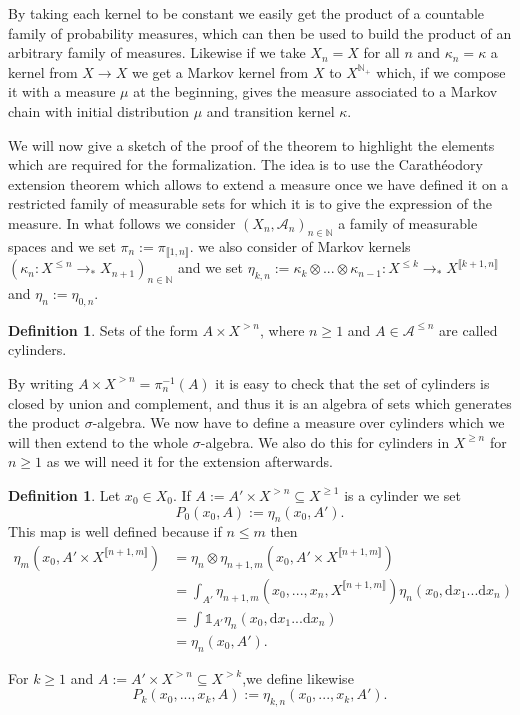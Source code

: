 \documentclass{article}
\newcommand{\A}{\mathcal{A}}
\newcommand{\N}{\mathbb{N}}
\newcommand{\inv}{^{-1}}
\newcommand{\Xge}[1]{X^{\ge#1}}
\newcommand{\Xle}[1]{X^{\le#1}}
\newcommand{\Xgt}[1]{X^{>#1}}
\newcommand{\Xgtn}{X^{>n}}
\newcommand{\Xlen}{X^{\le n}}
\newcommand{\Alen}{\mathcal{A}^{\le n}}
\newcommand{\dx}{\mathrm{d}x}
\newcommand{\prth}[1]{\left(#1\right)}
\newcommand{\dbrack}[1]{\llbracket #1 \rrbracket}
\newcommand{\ox}{\otimes}
\newcommand{\piun}{{\pi_{\dbrack{1,n}}}}
\newcommand{\Xint}[1]{X^{\dbrack{#1}}}
\newcommand{\tost}{\to_*}
\newcommand{\ind}[1]{\mathbb{1}_{#1}}
\theoremstyle{definition}
\newtheorem{defi}[thm]{Definition}
\theoremstyle{remark}
\begin{document}
	By taking each kernel to be constant we easily get the product of a countable family of probability measures, which can then be used to build the product of an arbitrary family of measures. Likewise if we take $X_n = X$ for all $n$ and $\kappa_n = \kappa$ a kernel from $X \to X$ we get a Markov kernel from $X$ to $X^{\N_+}$ which, if we compose it with a measure $\mu$ at the beginning, gives the measure associated to a Markov chain with initial distribution $\mu$ and transition kernel $\kappa$.

	We will now give a sketch of the proof of the theorem to highlight the elements which are required for the formalization. The idea is to use the Carathéodory extension theorem which allows to extend a measure once we have defined it on a restricted family of measurable sets for which it is to give the expression of the measure. In what follows we consider $(X_n, \A_n)_{n\in\N}$ a family of measurable spaces and we set $\pi_n := \piun$. we also consider of Markov kernels $(\kappa_n : \Xlen \tost X_{n+1})_{n\in\N}$ and we set $\eta_{k,n} := \kappa_k \ox ... \ox \kappa_{n-1} : \Xle{k} \tost \Xint{k+1,n}$ and $\eta_n := \eta_{0,n}$.

	\begin{defi}
		\label{def:cylindres}
		Sets of the form $A \times \Xgtn$, where $n \ge 1$ and $A \in \Alen$ are called cylinders.
	\end{defi}

	By writing $A \times \Xgtn = \pi_n\inv(A)$ it is easy to check that the set of cylinders is closed by union and complement, and thus it is an algebra of sets which generates the product $\sigma$-algebra. We now have to define a measure over cylinders which we will then extend to the whole $\sigma$-algebra. We also do this for cylinders in $\Xge{n}$ for $n\ge1$ as we will need it for the extension afterwards.

	\begin{defi}
		\label{def:content}
		Let $x_0 \in X_0$. If $A := A' \times \Xgtn \subseteq \Xge{1}$ is a cylinder we set
		$$P_0(x_0, A) := \eta_n(x_0, A').$$
		This map is well defined because if $n \le m$ then
		\begin{align*}
			\eta_m\prth{x_0, A' \times \Xint{n+1,m}} &= \eta_n \ox \eta_{n+1,m} \prth{x_0, A' \times \Xint{n+1,m}} \\
			&= \int_{A'} \eta_{n+1, m}\prth{x_0, ..., x_n, \Xint{n+1,m}} \eta_n(x_0, \dx_1...\dx_n) \\
			&= \int \ind{A'} \eta_n(x_0, \dx_1...\dx_n) \\
			&= \eta_n(x_0, A').
		\end{align*}

		For $k \ge 1$ and $A := A' \times \Xgtn \subseteq \Xgt k$,we define likewise
		$$P_k (x_0, ..., x_k, A) := \eta_{k,n} (x_0,...,x_k,A').$$
	\end{defi}
\end{document}
